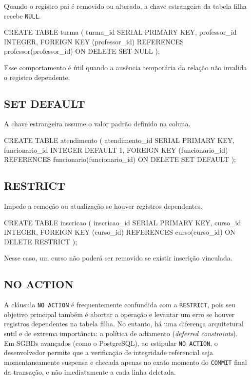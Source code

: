 Quando o registro pai é removido ou alterado, a chave estrangeira da tabela filha recebe \texttt{NULL}.

\begin{sqlcode}
CREATE TABLE turma (
    turma_id SERIAL PRIMARY KEY,
    professor_id INTEGER,
    FOREIGN KEY (professor_id)
        REFERENCES professor(professor_id)
        ON DELETE SET NULL
);
\end{sqlcode}

Esse comportamento é útil quando a ausência temporária da relação não invalida o registro dependente.

\subsection{SET DEFAULT}

A chave estrangeira assume o valor padrão definido na coluna.

\begin{sqlcode}
CREATE TABLE atendimento (
    atendimento_id SERIAL PRIMARY KEY,
    funcionario_id INTEGER DEFAULT 1,
    FOREIGN KEY (funcionario_id)
        REFERENCES funcionario(funcionario_id)
        ON DELETE SET DEFAULT
);
\end{sqlcode}

\subsection{RESTRICT}

Impede a remoção ou atualização se houver registros dependentes.

\begin{sqlcode}
CREATE TABLE inscricao (
    inscricao_id SERIAL PRIMARY KEY,
    curso_id INTEGER,
    FOREIGN KEY (curso_id)
        REFERENCES curso(curso_id)
        ON DELETE RESTRICT
);
\end{sqlcode}

Nesse caso, um curso não poderá ser removido se existir inscrição vinculada.

\subsection{NO ACTION}

A cláusula \texttt{NO ACTION} é frequentemente confundida com a \texttt{RESTRICT}, pois seu objetivo principal também é abortar a operação e levantar um erro se houver registros dependentes na tabela filha. No entanto, há uma diferença arquitetural sutil e de extrema importância: a política de adiamento (\textit{deferred constraints}). Em SGBDs avançados (como o PostgreSQL), ao estipular \texttt{NO ACTION}, o desenvolvedor permite que a verificação de integridade referencial seja momentaneamente suspensa e checada apenas no exato momento do \texttt{COMMIT} final da transação, e não imediatamente a cada linha deletada.

